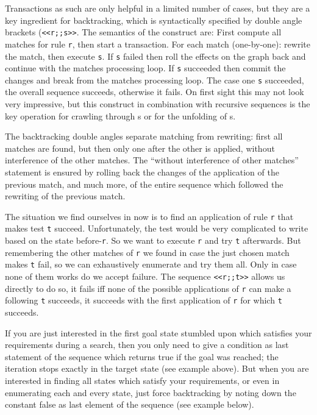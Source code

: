 Transactions as such are only helpful in a limited number of cases, but they are a key ingredient for backtracking, which is syntactically specified by double angle brackets (\texttt{<<r;;s>>}.
The semantics of the construct are:
First compute all matches for rule \texttt{r}, then start a transaction.
For each match (one-by-one): rewrite the match, then execute \texttt{s}.
If \texttt{s} failed then roll the effects on the graph back and continue with the matches processing loop.
If \texttt{s} succeeded then commit the changes and break from the matches processing loop.
The case one \texttt{s} succeeded, the overall sequence succeeds, otherwise it fails.
On first sight this may not look very impressive, but this construct in combination with recursive sequences is the key operation for crawling through s or for the unfolding of s.

The backtracking double angles separate matching from rewriting: first all matches are found, but then only one after the other is applied, without interference of the other matches.
The ``without interference of other matches'' statement is ensured by rolling back the changes of the application of the previous match, and much more, of the entire sequence which followed the rewriting of the previous match.

\begin{example}
The situation we find ourselves in now is to find an application of rule \texttt{r} that makes test \texttt{t} succeed. Unfortunately, the test would be very complicated to write based on the state before-\texttt{r}. So we want to execute \texttt{r} and try \texttt{t} afterwards. But remembering the other matches of \texttt{r} we found in case the just chosen match makes \texttt{t} fail, so we can exhaustively enumerate and try them all. Only in case none of them works do we accept failure.
The sequence \verb#<<r;;t>># allows us directly to do so, it fails iff none of the possible applications of \texttt{r} can make a following \texttt{t} succeeds, it succeeds with the first application of \texttt{r} for which \texttt{t} succeeds. 
\end{example}

If you are just interested in the first goal state stumbled upon which satisfies your requirements during a search,
then you only need to give a condition as last statement of the sequence which returns true if the goal was reached; the iteration stops exactly in the target state (see example above).
But when you are interested in finding all states which satisfy your requirements, or even in enumerating each and every state, just force backtracking by noting down the constant false as last element of the sequence (see example below).

